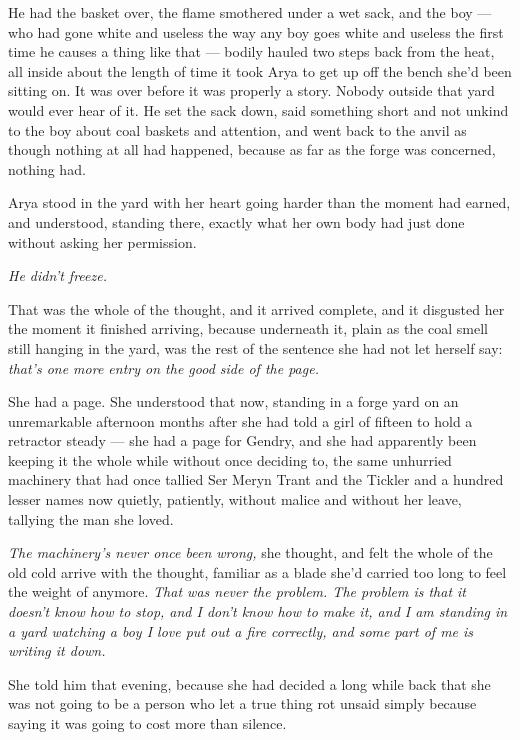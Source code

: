 He had the basket over, the flame smothered under a wet sack, and the boy — who had gone white and useless the way any boy goes white and useless the first time he causes a thing like that — bodily hauled two steps back from the heat, all inside about the length of time it took Arya to get up off the bench she’d been sitting on. It was over before it was properly a story. Nobody outside that yard would ever hear of it. He set the sack down, said something short and not unkind to the boy about coal baskets and attention, and went back to the anvil as though nothing at all had happened, because as far as the forge was concerned, nothing had.

Arya stood in the yard with her heart going harder than the moment had earned, and understood, standing there, exactly what her own body had just done without asking her permission.

\textit{He didn’t freeze.}

That was the whole of the thought, and it arrived complete, and it disgusted her the moment it finished arriving, because underneath it, plain as the coal smell still hanging in the yard, was the rest of the sentence she had not let herself say: \textit{that’s one more entry on the good side of the page.}

She had a page. She understood that now, standing in a forge yard on an unremarkable afternoon months after she had told a girl of fifteen to hold a retractor steady — she had a page for Gendry, and she had apparently been keeping it the whole while without once deciding to, the same unhurried machinery that had once tallied Ser Meryn Trant and the Tickler and a hundred lesser names now quietly, patiently, without malice and without her leave, tallying the man she loved.

\textit{The machinery’s never once been wrong,} she thought, and felt the whole of the old cold arrive with the thought, familiar as a blade she’d carried too long to feel the weight of anymore. \textit{That was never the problem. The problem is that it doesn’t know how to stop, and I don’t know how to make it, and I am standing in a yard watching a boy I love put out a fire correctly, and some part of me is writing it down.}

\sceneBreak

She told him that evening, because she had decided a long while back that she was not going to be a person who let a true thing rot unsaid simply because saying it was going to cost more than silence.

